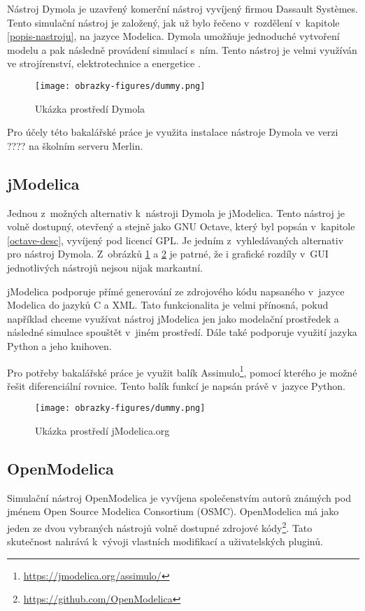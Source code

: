 Nástroj Dymola je uzavřený komerční nástroj vyvíjený firmou Dassault Systèmes. Tento simulační nástroj je založený, jak už bylo řečeno v~rozdělení v~kapitole \ref{popis-nastroju}, na jazyce Modelica. Dymola umožňuje jednoduché vytvoření modelu a pak následně provádení simulací s~ním. Tento nástroj je velmi využíván ve strojírenství, elektrotechnice a energetice .

\begin{figure}
    \centering
    \texttt{[image: obrazky-figures/dummy.png]}
    \caption{Ukázka prostředí Dymola}
    \label{fig:dymola}
\end{figure}

Pro účely této bakalářské práce je využita instalace nástroje Dymola ve verzi ???? na školním serveru Merlin.


\subsection{jModelica}
Jednou z~možných alternativ k~nástroji Dymola je jModelica. Tento nástroj je volně dostupný, otevřený a stejně jako GNU Octave, který byl popsán v~kapitole \ref{octave-desc}, vyvíjený pod licencí GPL. Je jedním z~vyhledávaných alternativ pro nástroj Dymola. Z~obrázků \ref{fig:dymola} a \ref{fig:jmodelica} je patrné, že i grafické rozdíly v~GUI jednotlivých nástrojů nejsou nijak markantní.

jModelica podporuje přímé generování ze zdrojového kódu napsaného v~jazyce Modelica do jazyků C a XML. Tato funkcionalita je velmi přínosná, pokud například chceme využívat nástroj jModelica jen jako modelační prostředek a následné simulace spouštět v~jiném prostředí. Dále také podporuje využití jazyka Python a jeho knihoven.

Pro potřeby bakalářské práce je využit balík Assimulo\footnote{\url{https://jmodelica.org/assimulo/}}, pomocí kterého je možné řešit diferenciální rovnice. Tento balík funkcí je napsán právě v~jazyce Python.

\begin{figure}
    \centering
    \texttt{[image: obrazky-figures/dummy.png]}
    \caption{Ukázka prostředí jModelica.org}
    \label{fig:jmodelica}
\end{figure}

\subsection{OpenModelica}
\label{openmodelica-desc}
Simulační nástroj OpenModelica je vyvíjena společenstvím autorů známých pod jménem Open Source Modelica Consortium (OSMC). OpenModelica má jako jeden ze dvou vybraných nástrojů volně dostupné zdrojové kódy\footnote{\url{https://github.com/OpenModelica}}. Tato skutečnost nahrává k~vývoji vlastních modifikací a uživatelských pluginů.

